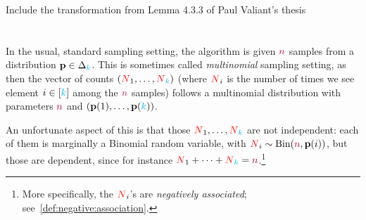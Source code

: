 \tbc
Include the transformation from Lemma 4.3.3 of Paul Valiant's thesis\\\\\\

In the usual, standard sampling setting, the algorithm is given ${\textcolor{purple}{n}}$ \iid samples from a distribution $\mathbf{p}\in\Delta_{{\textcolor{cyan}{k}}}$. This is sometimes called \emph{multinomial} sampling setting, as then the vector of counts $(\textcolor{red}{N}_1,\dots,\textcolor{red}{N}_{\textcolor{cyan}{k}})$ (where $\textcolor{red}{N}_i$ is the number of times we see element $i\in[{\textcolor{cyan}{k}}]$ among the ${\textcolor{purple}{n}}$ samples) follows a multinomial distribution with parameters ${\textcolor{purple}{n}}$ and $(\mathbf{p}(1),\dots,\mathbf{p}({\textcolor{cyan}{k}}))$.

An unfortunate aspect of this is that those $\textcolor{red}{N}_1,\dots,\textcolor{red}{N}_{\textcolor{cyan}{k}}$ are not independent: each of them is marginally a Binomial random variable, with $\occur_i \sim \binomial{\ns}{\p(i)}$, but those are dependent, since for instance $\textcolor{red}{N}_1+\dots+\textcolor{red}{N}_{\textcolor{cyan}{k}}={\textcolor{purple}{n}}$.\footnote{More specifically, the $\textcolor{red}{N}_i$'s are \emph{negatively associated}; see~\cref{def:negative:association}.}